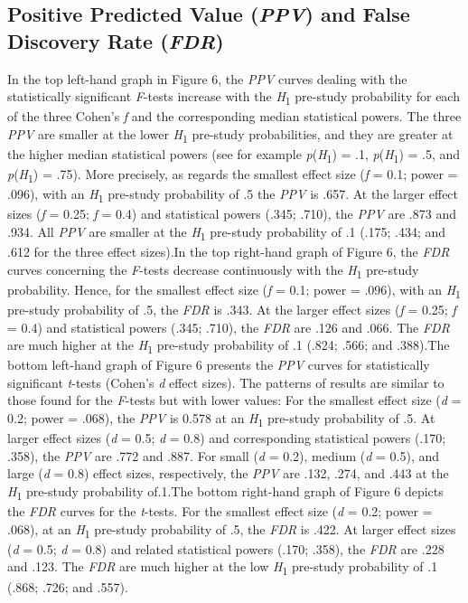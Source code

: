 \documentclass[authordate, meta, issue]{jote-new-article}
\begin{document}
	


	\subsection{Positive Predicted Value (\emph{PPV}) and False Discovery Rate (\emph{FDR}) }



	In the top left-hand graph in Figure 6, the \emph{PPV} curves dealing with the statistically significant \emph{F}-tests increase with the \emph{H}\textsubscript{1} pre-study probability for each of the three Cohen's \emph{f} and the corresponding median statistical powers. The three \emph{PPV} are smaller at the lower \emph{H}\textsubscript{1} pre-study probabilities, and they are greater at the higher median statistical powers (see for example \emph{p}(\emph{H}\textsubscript{1}) = .1, \emph{p}(\emph{H}\textsubscript{1}) = .5, and \emph{p}(\emph{H}\textsubscript{1}) = .75). More precisely, as regards the smallest effect size (\emph{f} = 0.1; power = .096), with an \emph{H}\textsubscript{1} pre-study probability of .5 the \emph{PPV} is .657. At the larger effect sizes (\emph{f} = 0.25; \emph{f} = 0.4) and statistical powers (.345; .710), the \emph{PPV} are .873 and .934. All \emph{PPV} are smaller at the \emph{H}\textsubscript{1} pre-study probability of .1 (.175; .434; and .612 for the three effect sizes).In the top right-hand graph of Figure 6, the \emph{FDR} curves concerning the \emph{F}-tests decrease continuously with the \emph{H}\textsubscript{1} pre-study probability. Hence, for the smallest effect size (\emph{f} = 0.1; power = .096), with an \emph{H}\textsubscript{1} pre-study probability of .5, the \emph{FDR} is .343. At the larger effect sizes (\emph{f} = 0.25; \emph{f} = 0.4) and statistical powers (.345; .710), the \emph{FDR} are .126 and .066. The \emph{FDR} are much higher at the \emph{H}\textsubscript{1} pre-study probability of .1 (.824; .566; and .388).The bottom left-hand graph of Figure 6 presents the \emph{PPV} curves for statistically significant \emph{t}-tests (Cohen's \emph{d} effect sizes). The patterns of results are similar to those found for the \emph{F}-tests but with lower values: For the smallest effect size (\emph{d} = 0.2; power = .068), the \emph{PPV} is 0.578 at an \emph{H}\textsubscript{1} pre-study probability of .5. At larger effect sizes (\emph{d} = 0.5; \emph{d} = 0.8) and corresponding statistical powers (.170; .358), the \emph{PPV} are .772 and .887. For small (\emph{d} = 0.2), medium (\emph{d }= 0.5), and large (\emph{d} = 0.8) effect sizes, respectively, the \emph{PPV} are .132, .274, and .443 at the \emph{H}\textsubscript{1} pre-study probability of.1.The bottom right-hand graph of Figure 6 depicts the \emph{FDR} curves for the \emph{t}-tests. For the smallest effect size (\emph{d} = 0.2; power = .068), at an \emph{H}\textsubscript{1} pre-study probability of .5, the \emph{FDR} is .422. At larger effect sizes (\emph{d} = 0.5; \emph{d} = 0.8) and related statistical powers (.170; .358), the \emph{FDR} are .228 and .123. The \emph{FDR} are much higher at the low \emph{H}\textsubscript{1} pre-study probability of .1 (.868; .726; and .557).
\end{document}
